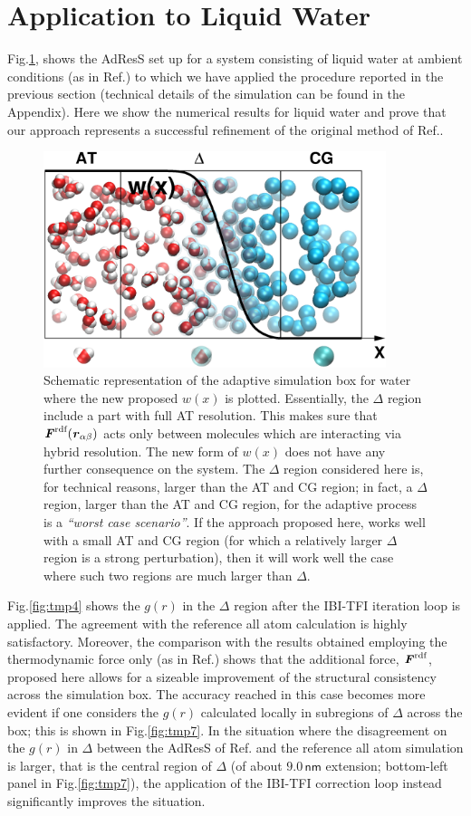 \documentclass[aps,pre,preprint]{revtex4}
\renewcommand{\v}[1]{\textbf{\textit{#1}}}
\begin{document}
\section{Application to Liquid Water}
Fig.\ref{adapt-wat}, shows the AdResS set up for a system consisting of liquid water at ambient conditions (as in Ref.\cite{prlgc}) to which we have applied the procedure reported in the previous section (technical details of the simulation can be found in the Appendix). Here we show the numerical results for liquid water and prove that our approach represents a successful refinement of the original method of Ref.\cite{prlgc}. 
\begin{figure}
  \centering
  \includegraphics[angle=0,width=10cm]{adapt-wat.eps}
  \caption{Schematic representation of the adaptive simulation box for water where the new proposed $w(x)$ is plotted. Essentially, the $\Delta$ region include a part with full AT resolution. This makes sure that $\v F^{\textrm{rdf}}(\v r_{\alpha\beta})$ acts only between molecules which are interacting via hybrid resolution. The new form of $w(x)$ does not have any further consequence on the system. The $\Delta$ region considered here is, for technical reasons, larger than the AT and CG region; in fact, a $\Delta$ region, larger than the AT and CG region, for the adaptive process is a {\it ``worst case scenario''}. If the approach proposed here, works well with a small AT and CG region (for which a relatively larger $\Delta$ region is a strong perturbation), then it will work well the case where such two regions are much larger than $\Delta$.}
  \label{adapt-wat}
\end{figure}
Fig.\ref{fig:tmp4} shows the $g(r)$ in the $\Delta$ region after the IBI-TFI iteration loop is applied. The agreement with the reference all atom calculation is highly satisfactory. Moreover, the comparison with the results obtained employing the thermodynamic force only (as in Ref.\cite{prlgc}) shows that the additional force, $\v F^{\textrm{rdf}}$, proposed here allows for a sizeable improvement of the structural consistency across the simulation box. The accuracy reached in this case becomes more evident if one considers the $g(r)$ calculated locally in subregions of $\Delta$ across the box; this is shown in Fig.\ref{fig:tmp7}. In the situation where the disagreement on the $g(r)$ in $\Delta$ between the AdResS of Ref.\cite{prlgc} and the reference all atom simulation is larger, that is the central region of $\Delta$ (of about $9.0\, \textsf{nm}$ extension; bottom-left panel in Fig.\ref{fig:tmp7}), the application of the  IBI-TFI correction loop instead significantly improves the situation. 
\end{document}
